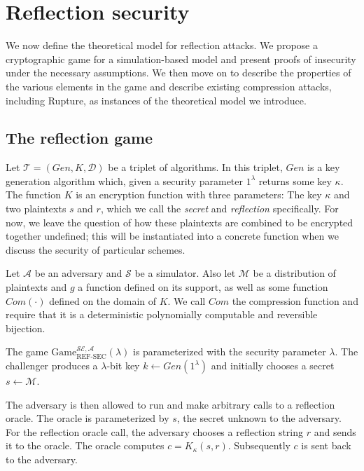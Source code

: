 \section{Reflection security}\label{sec:refsec}

We now define the theoretical model for reflection attacks. We propose a
cryptographic game for a simulation-based model and present proofs of insecurity
under the necessary assumptions. We then move on to describe the properties of
the various elements in the game and describe existing compression attacks,
including Rupture, as instances of the theoretical model we introduce.

\subsection{The reflection game}\label{subsec:refsecgame}

Let $\mathcal{T} = (Gen, K, \mathcal{D})$ be a triplet of algorithms. In this
triplet, $Gen$ is a key generation algorithm which, given a security parameter
$1^\lambda$ returns some key $\kappa$. The function $K$ is an encryption
function with three parameters: The key $\kappa$ and two plaintexts $s$ and $r$,
which we call the \textit{secret} and \textit{reflection} specifically. For now,
we leave the question of how these plaintexts are combined to be encrypted
together undefined; this will be instantiated into a concrete function when we
discuss the security of particular schemes.

Let $\mathcal{A}$ be an adversary and $\mathcal{S}$ be a simulator. Also let
$\mathcal{M}$ be a distribution of plaintexts and $g$ a function defined on its
support, as well as some function $Com(\cdot)$ defined on the domain of $K$. We
call $Com$ the compression function and require that it is a deterministic
polynomially computable and reversible bijection.

The game $\text{Game}_{\text{REF-SEC}}^{\mathcal{SE},\mathcal{A}}(\lambda)$ is
parameterized with the security parameter $\lambda$. The challenger produces a
$\lambda$-bit key $k \leftarrow Gen(1^\lambda)$ and initially
chooses a secret $s \leftarrow \mathcal{M}$.

The adversary is then allowed to run and make arbitrary calls to a reflection
oracle. The oracle is parameterized by $s$, the secret unknown to the adversary.
For the reflection oracle call, the adversary chooses a reflection string $r$
and sends it to the oracle. The oracle computes $c = K_\kappa(s, r)$.
Subsequently $c$ is sent back to the adversary.

